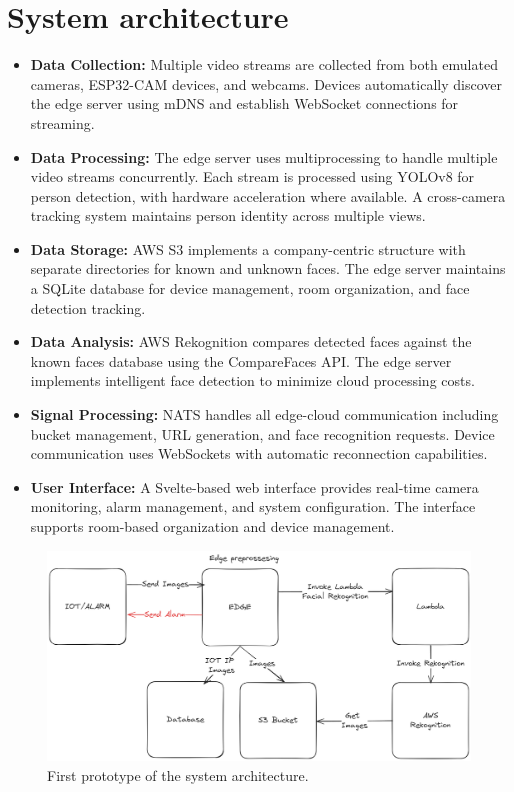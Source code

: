 \documentclass[conference]{IEEEtran}
\begin{document}
\section{System architecture}
\begin{itemize}
      \item \textbf{Data Collection:} Multiple video streams are collected from both emulated cameras, ESP32-CAM devices, and webcams.
            Devices automatically discover the edge server using mDNS and establish WebSocket connections for streaming.
      \item \textbf{Data Processing:} The edge server uses multiprocessing to handle multiple video streams concurrently.
            Each stream is processed using YOLOv8 for person detection, with hardware acceleration where available.
            A cross-camera tracking system maintains person identity across multiple views.
      \item \textbf{Data Storage:} AWS S3 implements a company-centric structure with separate directories for known and unknown faces.
            The edge server maintains a SQLite database for device management, room organization, and face detection tracking.
      \item \textbf{Data Analysis:} AWS Rekognition compares detected faces against the known faces database using the CompareFaces API.
            The edge server implements intelligent face detection to minimize cloud processing costs.
      \item \textbf{Signal Processing:} NATS handles all edge-cloud communication including bucket management, URL generation,
            and face recognition requests. Device communication uses WebSockets with automatic reconnection capabilities.
      \item \textbf{User Interface:} A Svelte-based web interface provides real-time camera monitoring, alarm management,
            and system configuration. The interface supports room-based organization and device management.
\end{itemize}

\begin{figure}[h!]
      \centering
      \includegraphics[width=1\linewidth]{images/architecture.excalidraw.png}
      \caption{First prototype of the system architecture.}
      \label{fig:prototype-1}
\end{figure}
\end{document}
